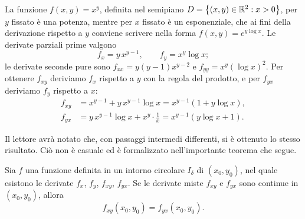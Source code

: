 \begin{esempio}\label{es:derivate-xy}
La funzione $f(x,y)=x^{y}$, definita nel semipiano $D=\left\{ (x,y)\in\mathbb{R}^{2} : x>0 \right\}$, per $y$
fissato è una potenza, mentre per $x$ fissato è un esponenziale, che ai fini della
derivazione rispetto a $y$ conviene scrivere nella forma $f(x,y)=e^{y\log x}$. Le derivate
parziali prime valgono
\begin{equation}\label{eq:xy-prime}
  f_{x}=y\,x^{y-1}, \qquad f_{y}=x^{y}\log x ;
\end{equation}
le derivate seconde pure sono $f_{xx}=y(y-1)x^{y-2}$ e $f_{yy}=x^{y}(\log x)^{2}$. Per
ottenere $f_{xy}$ deriviamo $f_{x}$ rispetto a $y$ con la regola del prodotto, e per
$f_{yx}$ deriviamo $f_{y}$ rispetto a $x$:
\begin{equation}\label{eq:xy-miste}
\begin{aligned}
  f_{xy}&=x^{y-1}+y\,x^{y-1}\log x=x^{y-1}(1+y\log x),\\
  f_{yx}&=y\,x^{y-1}\log x+x^{y}\cdot\frac1x=x^{y-1}(y\log x+1).
\end{aligned}
\end{equation}
\end{esempio}

Il lettore avrà notato che, con passaggi intermedi differenti, si è ottenuto lo stesso
risultato. Ciò non è casuale ed è formalizzato nell'importante teorema che segue.

\begin{teorema}[di Schwarz]\label{teo:schwarz}
Sia $f$ una funzione definita in un intorno circolare $I_{\delta}$ di $(x_{0},y_{0})$, nel
quale esistono le derivate $f_{x}$, $f_{y}$, $f_{xy}$, $f_{yx}$. Se le derivate miste
$f_{xy}$ e $f_{yx}$ sono continue in $(x_{0},y_{0})$, allora
\begin{equation}\label{eq:schwarz}
  f_{xy}(x_{0},y_{0})=f_{yx}(x_{0},y_{0}) .
\end{equation}
\end{teorema}

\begin{schema}
\end{schema}

